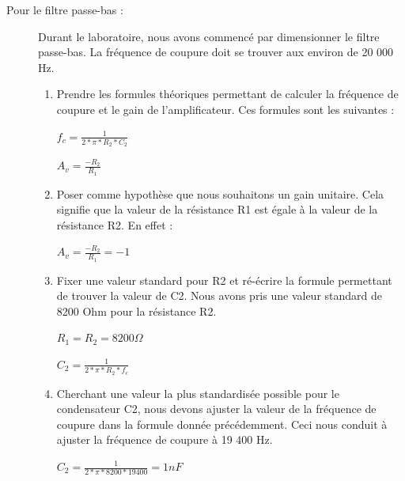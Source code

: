 \documentclass[10pt, oneside, a4paper]{article}
\begin{document}
\begin{description}
\item[ Pour le filtre passe-bas :] Durant le laboratoire, nous avons commencé par dimensionner le filtre passe-bas. La fréquence de coupure doit se trouver aux environ de 20 000 Hz.
    \begin{enumerate}
        \item Prendre les formules théoriques permettant de calculer la fréquence de coupure et le gain de l'amplificateur. Ces formules sont les suivantes : 
            \begin{center} $f_{c}=\frac{1}{2*\pi*R_{2}*C_{2}}$ \end{center} 
            \begin{center} $A_{v}=\frac{-R_{2}}{R_{1}}$ \end{center} 
        \item Poser comme hypothèse que nous souhaitons un gain unitaire. Cela signifie que la valeur de la résistance R1 est égale à la valeur de la résistance R2. En effet : \begin{center} $A_{v}=\frac{-R_{2}}{R_{1}} = -1$ \end{center} 
        \item Fixer une valeur standard pour R2 et ré-écrire la formule permettant de trouver la valeur de C2. Nous avons pris une valeur standard de 8200 Ohm pour la résistance R2.
            \begin{center} $R_{1}= R_{2} = 8 200\Omega $ \end{center}
            \begin{center} $C_{2}=\frac{1}{2*\pi*R_{2}*f_{c}}$ \end{center} 
        \item Cherchant une valeur la plus standardisée possible pour le condensateur C2, nous devons ajuster la valeur de la fréquence de coupure dans la formule donnée précédemment. Ceci nous conduit à ajuster la fréquence de coupure à 19 400 Hz.
            \begin{center} $C_{2}=\frac{1}{2*\pi*8 200*19 400}= 1 nF$ \end{center} 
    \end{enumerate}
\end{description}
\end{document}
